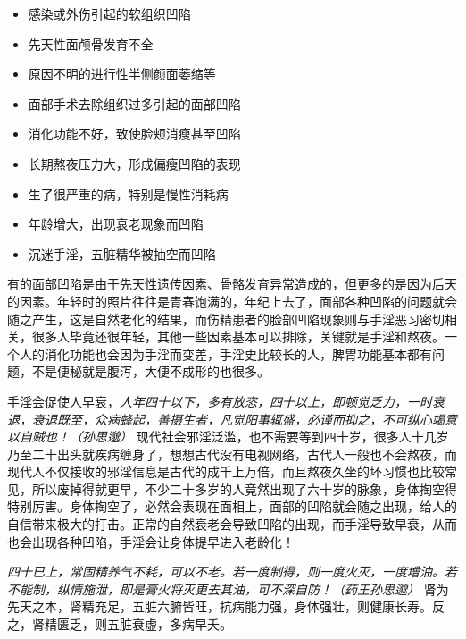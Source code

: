 \begin{multicols}{2}
    \begin{itemize}
        \item 感染或外伤引起的软组织凹陷
        \item 先天性面颅骨发育不全
        \item 原因不明的进行性半侧颜面萎缩等
        \item 面部手术去除组织过多引起的面部凹陷
        \item 消化功能不好，致使脸颊消瘦甚至凹陷
        \item 长期熬夜压力大，形成偏瘦凹陷的表现
        \item 生了很严重的病，特别是慢性消耗病
        \item 年龄增大，出现衰老现象而凹陷
        \item 沉迷手淫，五脏精华被抽空而凹陷
    \end{itemize}
\end{multicols}

有的面部凹陷是由于先天性遗传因素、骨骼发育异常造成的，但更多的是因为后天的因素。年轻时的照片往往是青春饱满的，年纪上去了，面部各种凹陷的问题就会随之产生，这是自然老化的结果，而伤精患者的脸部凹陷现象则与手淫恶习密切相关，很多人毕竟还很年轻，其他一些因素基本可以排除，关键就是手淫和熬夜。一个人的消化功能也会因为手淫而变差，手淫史比较长的人，脾胃功能基本都有问题，不是便秘就是腹泻，大便不成形的也很多。

手淫会促使人早衰，\textit{人年四十以下，多有放恣，四十以上，即顿觉乏力，一时衰退，衰退既至，众病蜂起，善摄生者，凡觉阳事辄盛，必谨而抑之，不可纵心竭意以自贼也！（孙思邈）} 现代社会邪淫泛滥，也不需要等到四十岁，很多人十几岁乃至二十出头就疾病缠身了，想想古代没有电视网络，古代人一般也不会熬夜，而现代人不仅接收的邪淫信息是古代的成千上万倍，而且熬夜久坐的坏习惯也比较常见，所以废掉得就更早，不少二十多岁的人竟然出现了六十岁的脉象，身体掏空得特别厉害。身体掏空了，必然会表现在面相上，面部的凹陷就会随之出现，给人的自信带来极大的打击。正常的自然衰老会导致凹陷的出现，而手淫导致早衰，从而也会出现各种凹陷，手淫会让身体提早进入老龄化！

\textit{四十已上，常固精养气不耗，可以不老。若一度制得，则一度火灭，一度增油。若不能制，纵情施泄，即是膏火将灭更去其油，可不深自防！（药王孙思邈）} 肾为先天之本，肾精充足，五脏六腑皆旺，抗病能力强，身体强壮，则健康长寿。反之，肾精匮乏，则五脏衰虚，多病早夭。

